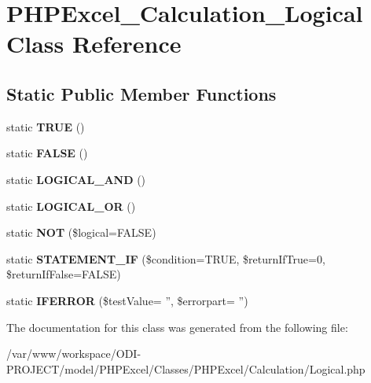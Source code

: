\section{P\+H\+P\+Excel\+\_\+\+Calculation\+\_\+\+Logical Class Reference}
\label{class_p_h_p_excel___calculation___logical}
\subsection*{Static Public Member Functions}
\begin{DoxyCompactItemize}
\item 
static {\bfseries T\+R\+U\+E} ()\label{class_p_h_p_excel___calculation___logical_ac6f0a7dfbe86e540a0fe9021a3962fac}

\item 
static {\bfseries F\+A\+L\+S\+E} ()\label{class_p_h_p_excel___calculation___logical_a91aa7062a9a4f1c039d191a71d63d6a0}

\item 
static {\bfseries L\+O\+G\+I\+C\+A\+L\+\_\+\+A\+N\+D} ()\label{class_p_h_p_excel___calculation___logical_a6831077d297ca6b4439bf70db9c4a983}

\item 
static {\bfseries L\+O\+G\+I\+C\+A\+L\+\_\+\+O\+R} ()\label{class_p_h_p_excel___calculation___logical_abc3c304531b94d60e84f40b67e41c0a2}

\item 
static {\bfseries N\+O\+T} (\$logical=F\+A\+L\+S\+E)\label{class_p_h_p_excel___calculation___logical_aec5ca3492d3e34ef234f90462615e05b}

\item 
static {\bfseries S\+T\+A\+T\+E\+M\+E\+N\+T\+\_\+\+I\+F} (\$condition=T\+R\+U\+E, \$return\+If\+True=0, \$return\+If\+False=F\+A\+L\+S\+E)\label{class_p_h_p_excel___calculation___logical_aa7bd8fae1c98c838cf8522611a16f739}

\item 
static {\bfseries I\+F\+E\+R\+R\+O\+R} (\$test\+Value= '', \$errorpart= '')\label{class_p_h_p_excel___calculation___logical_a174d984a5bc107a4fd9258d79268115e}

\end{DoxyCompactItemize}


The documentation for this class was generated from the following file\+:\begin{DoxyCompactItemize}
\item 
/var/www/workspace/\+O\+D\+I-\/\+P\+R\+O\+J\+E\+C\+T/model/\+P\+H\+P\+Excel/\+Classes/\+P\+H\+P\+Excel/\+Calculation/Logical.\+php\end{DoxyCompactItemize}
